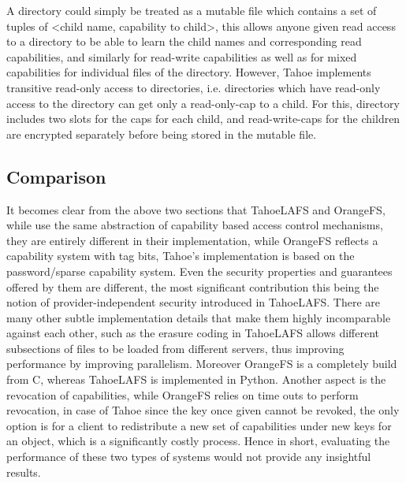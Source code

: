 A directory could simply be treated as a mutable file which contains a set of tuples of <child name, capability to child>, this allows anyone given read access to a directory to be able to learn the child names and corresponding read capabilities, and similarly for read-write capabilities as well as for mixed capabilities for individual files of the directory. However, Tahoe implements transitive read-only access to directories, i.e. directories which have read-only access to the directory can get only a read-only-cap to a child. For this, directory includes two slots for the caps for each child, and read-write-caps for the children are encrypted separately before being stored in the mutable file.

\subsection{Comparison}
It becomes clear from the above two sections that TahoeLAFS and OrangeFS, while use the same abstraction of capability based access control mechanisms, they are entirely different in their implementation, while OrangeFS reflects a capability system with tag bits, Tahoe's implementation is based on the password/sparse capability system. Even the security properties and guarantees offered by them are different, the most significant contribution this being the notion of provider-independent security introduced in TahoeLAFS. There are many other subtle implementation details that make them highly incomparable against each other, such as the erasure coding in TahoeLAFS allows different subsections of files to be loaded from different servers, thus improving performance by improving parallelism. Moreover OrangeFS is a completely build from C, whereas TahoeLAFS is implemented in Python. Another aspect is the revocation of capabilities, while OrangeFS relies on time outs to perform revocation, in case of Tahoe since the key once given cannot be revoked, the only option is for a client to redistribute a new set of capabilities under new keys for an object, which is a significantly costly process. Hence in short, evaluating the performance of these two types of systems would not provide any insightful results.


